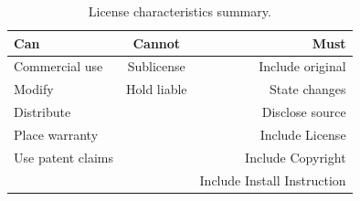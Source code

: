 \begin{table}[H]
  \centering
  \begin{tabular}{ l | c | r }
    Can &  Cannot & Must \\
    \hline
    Commercial use    & Sublicense    &  Include original \\
    Modify            & Hold liable   &  State changes \\
    Distribute        &               &  Disclose source \\
    Place warranty    &               &  Include License \\
    Use patent claims &               &  Include Copyright \\
                      &               &  Include Install Instruction \\
  \end{tabular}
  \caption{License characteristics summary.}
\end{table}
